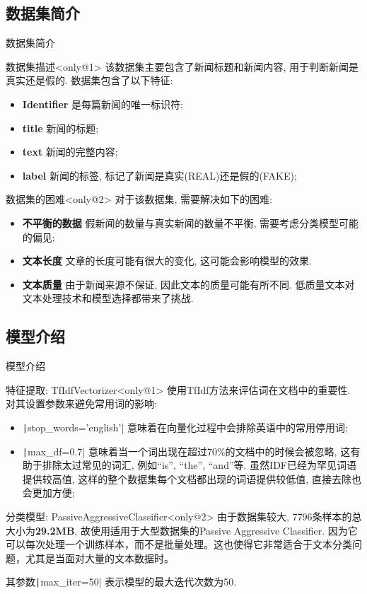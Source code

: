 \documentclass{beamer}
\begin{document}
\subsection{数据集简介}
\begin{frame}[fragile]{数据集简介}
	\begin{block}{数据集描述}<only@1>
		该数据集主要包含了新闻标题和新闻内容, 用于判断新闻是真实还是假的. 数据集包含了以下特征:
		\begin{itemize}
			\item \textbf{Identifier }是每篇新闻的唯一标识符;
			\item \textbf{title }新闻的标题;
			\item \textbf{text }新闻的完整内容;
			\item \textbf{label }新闻的标签, 标记了新闻是真实(REAL)还是假的(FAKE);
		\end{itemize}
	\end{block}
	\begin{block}{数据集的困难}<only@2>
		对于该数据集, 需要解决如下的困难:
		\begin{itemize}
			\item \textbf{不平衡的数据 }假新闻的数量与真实新闻的数量不平衡, 需要考虑分类模型可能的偏见;
			\item \textbf{文本长度 }文章的长度可能有很大的变化, 这可能会影响模型的效果.
			\item \textbf{文本质量 } 由于新闻来源不保证, 因此文本的质量可能有所不同. 低质量文本对文本处理技术和模型选择都带来了挑战.
		\end{itemize}
	\end{block}
\end{frame}
\subsection{模型介绍}
\begin{frame}[fragile]{模型介绍}
	\begin{block}{特征提取: TfIdfVectorizer}<only@1>
		使用TfIdf方法来评估词在文档中的重要性. 对其设置参数来避免常用词的影响:
		\begin{itemize}
			\item \texttt|stop_words='english'| 意味着在向量化过程中会排除英语中的常用停用词;
			\item \texttt|max_df=0.7| 意味着当一个词出现在超过70\%的文档中的时候会被忽略, 这有助于排除太过常见的词汇, 例如``is'', ``the'', ``and''等. 虽然IDF已经为罕见词语提供较高值, 这样的整个数据集每个文档都出现的词语提供较低值, 直接去除也会更加方便;
		\end{itemize}
	\end{block}
	\begin{block}{分类模型: PassiveAggressiveClassifier}<only@2>
		由于数据集较大, 7796条样本的总大小为\textbf{29.2MB}, 故使用适用于大型数据集的Passive Aggressive Classifier. 因为它可以每次处理一个训练样本，而不是批量处理。这也使得它非常适合于文本分类问题，尤其是当面对大量的文本数据时。

		其参数\texttt|max_iter=50| 表示模型的最大迭代次数为50.
	\end{block}
\end{frame}
\end{document}
